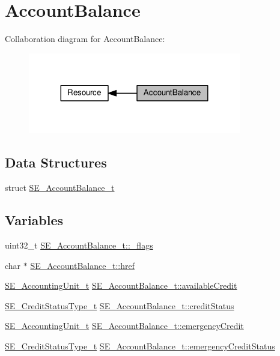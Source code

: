 \hypertarget{group__AccountBalance}{}\section{Account\+Balance}
\label{group__AccountBalance}
Collaboration diagram for Account\+Balance\+:\nopagebreak
\begin{figure}[H]
\begin{center}
\leavevmode
\includegraphics[width=263pt]{group__AccountBalance}
\end{center}
\end{figure}
\subsection*{Data Structures}
\begin{DoxyCompactItemize}
\item 
struct \hyperlink{structSE__AccountBalance__t}{S\+E\+\_\+\+Account\+Balance\+\_\+t}
\end{DoxyCompactItemize}
\subsection*{Variables}
\begin{DoxyCompactItemize}
\item 
uint32\+\_\+t \hyperlink{group__AccountBalance_ga159898a9138df7e3c536ff9d29b8e812}{S\+E\+\_\+\+Account\+Balance\+\_\+t\+::\+\_\+flags}
\item 
char $\ast$ \hyperlink{group__AccountBalance_gadccc9402133c6ca77e618358c960068b}{S\+E\+\_\+\+Account\+Balance\+\_\+t\+::href}
\item 
\hyperlink{structSE__AccountingUnit__t}{S\+E\+\_\+\+Accounting\+Unit\+\_\+t} \hyperlink{group__AccountBalance_ga91ffb617dfc316f5a8e2332846c5834d}{S\+E\+\_\+\+Account\+Balance\+\_\+t\+::available\+Credit}
\item 
\hyperlink{group__CreditStatusType_gadc768115dd9712a2356f01ac1aab6700}{S\+E\+\_\+\+Credit\+Status\+Type\+\_\+t} \hyperlink{group__AccountBalance_ga77494ec1a8a44d085d63afc1e0f936eb}{S\+E\+\_\+\+Account\+Balance\+\_\+t\+::credit\+Status}
\item 
\hyperlink{structSE__AccountingUnit__t}{S\+E\+\_\+\+Accounting\+Unit\+\_\+t} \hyperlink{group__AccountBalance_gab10aee5ec25f421ce4a7d4e470d72744}{S\+E\+\_\+\+Account\+Balance\+\_\+t\+::emergency\+Credit}
\item 
\hyperlink{group__CreditStatusType_gadc768115dd9712a2356f01ac1aab6700}{S\+E\+\_\+\+Credit\+Status\+Type\+\_\+t} \hyperlink{group__AccountBalance_ga93e7a084d8d647dee96f8650febd4683}{S\+E\+\_\+\+Account\+Balance\+\_\+t\+::emergency\+Credit\+Status}
\end{DoxyCompactItemize}


